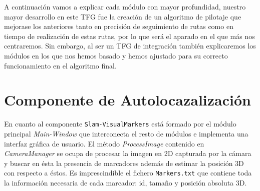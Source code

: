 \hspace{1cm} A continuación vamos a explicar cada módulo con mayor profundidad, nuestro mayor desarrollo en este TFG fue la creación de un algoritmo de pilotaje que mejorase los anteriores tanto en precisión de seguimiento de rutas como en tiempo de realización de estas rutas, por lo que será el aparado en el que más nos centraremos. Sin embargo, al ser un TFG de integración también explicaremos los módulos en los que nos hemos basado y hemos ajustado para su correcto funcionamiento en el algoritmo final. 

\section{Componente de Autolocazalización} 

\hspace{1cm} En cuanto al componente \texttt{Slam-VisualMarkers} está formado por el módulo principal \textit{Main-Window} que interconecta el resto de módulos e implementa una interfaz gráfica de usuario. El método \textit{ProcessImage} contenido en \textit{CameraManager} se ocupa de procesar la imagen en 2D capturada por la cámara y buscar en ésta la presencia de marcadores además de estimar la posición 3D con respecto a éstos. Es imprescindible el fichero \texttt{Markers.txt} que contiene toda la información necesaria de cada marcador: id, tamaño y posición absoluta 3D.

